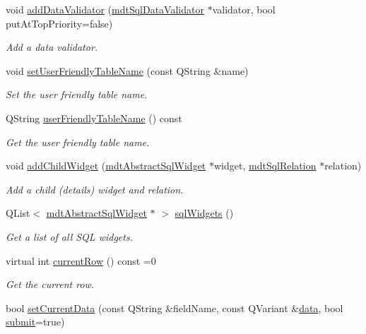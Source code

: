 \begin{DoxyCompactItemize}
void \hyperlink{classmdt_abstract_sql_widget_a0ccf93f41b1d7c479bfe0a52df2aac06}{add\-Data\-Validator} (\hyperlink{classmdt_sql_data_validator}{mdt\-Sql\-Data\-Validator} $\ast$validator, bool put\-At\-Top\-Priority=false)
\begin{DoxyCompactList}\small\item\em Add a data validator. \end{DoxyCompactList}\item 
void \hyperlink{classmdt_abstract_sql_widget_ac3fe33cfebb07d461ca06ee838a9b979}{set\-User\-Friendly\-Table\-Name} (const Q\-String \&name)
\begin{DoxyCompactList}\small\item\em Set the user friendly table name. \end{DoxyCompactList}\item 
Q\-String \hyperlink{classmdt_abstract_sql_widget_a8207edaf31a7d988db5b86a4099ad4eb}{user\-Friendly\-Table\-Name} () const 
\begin{DoxyCompactList}\small\item\em Get the user friendly table name. \end{DoxyCompactList}\item 
void \hyperlink{classmdt_abstract_sql_widget_a7225af05f3b10e82db939f0ec0996167}{add\-Child\-Widget} (\hyperlink{classmdt_abstract_sql_widget}{mdt\-Abstract\-Sql\-Widget} $\ast$widget, \hyperlink{classmdt_sql_relation}{mdt\-Sql\-Relation} $\ast$relation)
\begin{DoxyCompactList}\small\item\em Add a child (details) widget and relation. \end{DoxyCompactList}\item 
Q\-List$<$ \hyperlink{classmdt_abstract_sql_widget}{mdt\-Abstract\-Sql\-Widget} $\ast$ $>$ \hyperlink{classmdt_abstract_sql_widget_aa1b5762e5573c3e50c528bc0232a2b37}{sql\-Widgets} ()
\begin{DoxyCompactList}\small\item\em Get a list of all S\-Q\-L widgets. \end{DoxyCompactList}\item 
virtual int \hyperlink{classmdt_abstract_sql_widget_ab48f6375f55f1eaba309fb17aaaf5770}{current\-Row} () const =0
\begin{DoxyCompactList}\small\item\em Get the current row. \end{DoxyCompactList}\item 
bool \hyperlink{classmdt_abstract_sql_widget_add434461de436509b853fa9184c41360}{set\-Current\-Data} (const Q\-String \&field\-Name, const Q\-Variant \&\hyperlink{classmdt_abstract_sql_widget_a3d362ebfc2d4f4b40b48ca08db287b3c}{data}, bool \hyperlink{classmdt_abstract_sql_widget_a6678c45b0d46eb163f5b09d79ed001b5}{submit}=true)

\end{DoxyCompactItemize}
